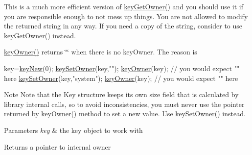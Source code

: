 This is a much more efficient version of \hyperlink{group__keyname_ga35922a017bee8b4bcb493bbdfad9d6f5}{key\-Get\-Owner()} and you should use it if you are responsible enough to not mess up things. You are not allowed to modify the returned string in any way. If you need a copy of the string, consider to use \hyperlink{group__keyname_ga35922a017bee8b4bcb493bbdfad9d6f5}{key\-Get\-Owner()} instead.

\hyperlink{group__keyname_gaf6485fb8599714b6bbd830cf915ffea5}{key\-Owner()} returns \char`\"{}\char`\"{} when there is no key\-Owner. The reason is 
\begin{DoxyCode}
key=\hyperlink{group__key_gad23c65b44bf48d773759e1f9a4d43b89}{keyNew}(0);
\hyperlink{group__keyname_ga88d6ec200ba0707b7c1b4a88133d2be4}{keySetOwner}(key,\textcolor{stringliteral}{""});
\hyperlink{group__keyname_gaf6485fb8599714b6bbd830cf915ffea5}{keyOwner}(key); \textcolor{comment}{// you would expect "" here}
\hyperlink{group__keyname_ga88d6ec200ba0707b7c1b4a88133d2be4}{keySetOwner}(key,\textcolor{stringliteral}{"system"});
\hyperlink{group__keyname_gaf6485fb8599714b6bbd830cf915ffea5}{keyOwner}(key); \textcolor{comment}{// you would expect "" here}
\end{DoxyCode}


\begin{DoxyNote}{Note}
Note that the Key structure keeps its own size field that is calculated by library internal calls, so to avoid inconsistencies, you must never use the pointer returned by \hyperlink{group__keyname_gaf6485fb8599714b6bbd830cf915ffea5}{key\-Owner()} method to set a new value. Use \hyperlink{group__keyname_ga88d6ec200ba0707b7c1b4a88133d2be4}{key\-Set\-Owner()} instead.
\end{DoxyNote}

\begin{DoxyParams}{Parameters}
{\em key} & the key object to work with \\
\hline
\end{DoxyParams}
\begin{DoxyReturn}{Returns}
a pointer to internal owner 
\end{DoxyReturn}

